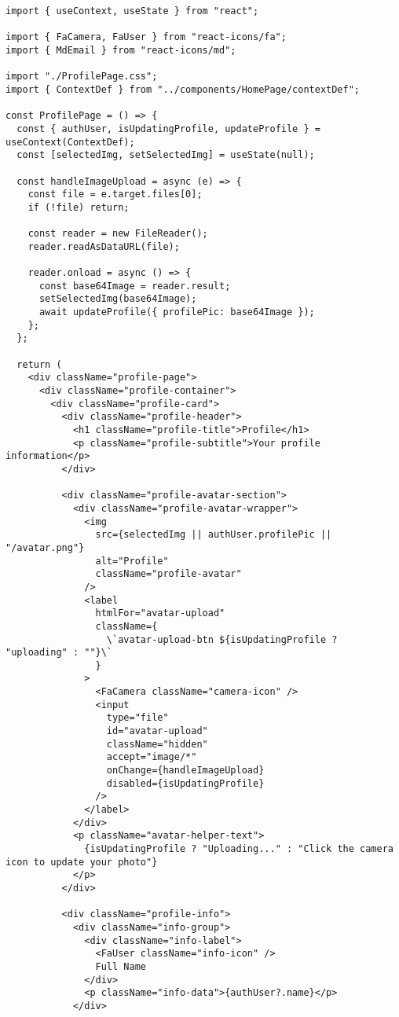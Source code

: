 \documentclass[12pt,a4paper]{report}
\begin{document}
\begin{lstlisting}
import { useContext, useState } from "react";

import { FaCamera, FaUser } from "react-icons/fa";
import { MdEmail } from "react-icons/md";

import "./ProfilePage.css";
import { ContextDef } from "../components/HomePage/contextDef";

const ProfilePage = () => {
  const { authUser, isUpdatingProfile, updateProfile } = useContext(ContextDef);
  const [selectedImg, setSelectedImg] = useState(null);

  const handleImageUpload = async (e) => {
    const file = e.target.files[0];
    if (!file) return;

    const reader = new FileReader();
    reader.readAsDataURL(file);

    reader.onload = async () => {
      const base64Image = reader.result;
      setSelectedImg(base64Image);
      await updateProfile({ profilePic: base64Image });
    };
  };

  return (
    <div className="profile-page">
      <div className="profile-container">
        <div className="profile-card">
          <div className="profile-header">
            <h1 className="profile-title">Profile</h1>
            <p className="profile-subtitle">Your profile information</p>
          </div>

          <div className="profile-avatar-section">
            <div className="profile-avatar-wrapper">
              <img
                src={selectedImg || authUser.profilePic || "/avatar.png"}
                alt="Profile"
                className="profile-avatar"
              />
              <label
                htmlFor="avatar-upload"
                className={
                  \`avatar-upload-btn ${isUpdatingProfile ? "uploading" : ""}\`
                }
              >
                <FaCamera className="camera-icon" />
                <input
                  type="file"
                  id="avatar-upload"
                  className="hidden"
                  accept="image/*"
                  onChange={handleImageUpload}
                  disabled={isUpdatingProfile}
                />
              </label>
            </div>
            <p className="avatar-helper-text">
              {isUpdatingProfile ? "Uploading..." : "Click the camera icon to update your photo"}
            </p>
          </div>

          <div className="profile-info">
            <div className="info-group">
              <div className="info-label">
                <FaUser className="info-icon" />
                Full Name
              </div>
              <p className="info-data">{authUser?.name}</p>
            </div>


\end{lstlisting}
\end{document}
